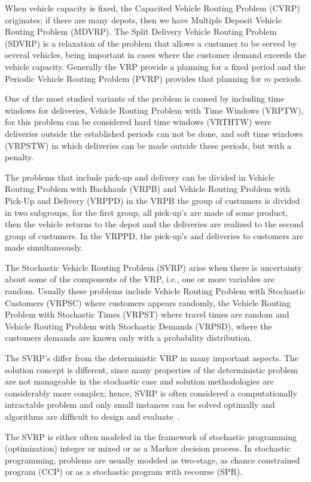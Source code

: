 When vehicle capacity is fixed, the Capacited Vehicle Routing Problem (CVRP) originates; if there are many depots, then we have Multiple Deposit Vehicle Routing Problem (MDVRP). The Split Delivery Vehicle Routing Problem (SDVRP) is a relaxation of the problem that allows a custumer to be served by several vehicles, being important in cases where the customer demand exceeds the vehicle capacity. Generally the VRP provide a planning for a fixed period and the Periodic Vehicle Routing Problem (PVRP) provides that planning for $m$ periods.

One of the most studied variants of the problem is caused by including time windows for deliveries, Vehicle Routing Problem with Time Windows (VRPTW), for this problem can be considered hard time windows (VRTHTW) were deliveries outside the established periods can not be done, and soft time windows (VRPSTW) in which deliveries can be made outside these periods, but with a penalty.

The problems that include pick-up and delivery can be divided in Vehicle Routing Problem with Backhauls (VRPB) and Vehicle Routing Problem with Pick-Up and Delivery (VRPPD) in the VRPB the group of custumers is divided in two subgroups, for the first group, all pick-up's are made of some product, then the vehicle returns to the depot and the deliveries are realized to the second group of custumers.  In the VRPPD, the pick-up's and deliveries to customers are made simultaneously.

The Stochastic Vehicle Routing Problem (SVRP) arise when there is uncertainty about some of the components of the VRP, i.e., one or more variables are random. Usually these problems include Vehicle Routing Problem with Stochastic Customers (VRPSC) where customers appears randomly, the Vehicle Routing Problem with Stochastic Times (VRPST) where travel times are random and Vehicle Routing Problem with Stochastic Demands (VRPSD), where the customers demands are known only with a probability distribution.

The SVRP's differ from the deterministic VRP in many important aspects. The solution concept is different, since many properties of the deterministic problem are not manageable in the stochastic case and solution methodologies are considerably more complex; hence, SVRP is often considered a computationally intractable problem and only small instances can be solved optimally and algorithms are difficult to design and evaluate~\cite{gendreau_stochastic_1996}.

The SVRP is either often modeled in the framework of stochastic programming (optimization) integer or mixed or as a Markov decision process. In stochastic programming, problems are usually modeled as two-stage, as chance constrained program (CCP) or as a stochastic program with recourse (SPR).


